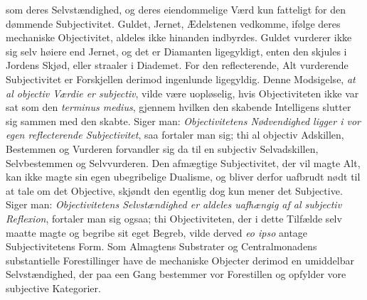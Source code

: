 \documentclass[12pt]{book}
\begin{document}
%
%
%
%
som deres Selvstændighed, og deres eiendommelige Værd kun fatteligt for den dømmende
Subjectivitet. Guldet, Jernet, Ædelstenen vedkomme, ifølge deres mechaniske
Objectivitet, aldeles ikke hinanden indbyrdes. Guldet vurderer ikke sig selv høiere end
Jernet, og det er Diamanten ligegyldigt, enten den skjules i Jordens Skjød, eller
straaler i Diademet. For den reflecterende, Alt vurderende Subjectivitet er Forskjellen
derimod ingenlunde ligegyldig. Denne Modsigelse, \emph{at al objectiv Værdie er
subjectiv}, vilde være uopløselig, hvis Objectiviteten ikke var sat som den
\textit{terminus medius}, gjennem hvilken den skabende Intelligens slutter sig sammen
med den skabte. Siger man: \emph{Objectivitetens Nødvendighed ligger i vor egen
reflecterende Subjectivitet}, saa fortaler man sig; thi al objectiv Adskillen,
Bestemmen og Vurderen forvandler sig da til en subjectiv Selvadskillen, Selvbestemmen og
Selvvurderen. Den afmægtige Subjectivitet, der vil magte Alt, kan ikke magte sin egen
ubegribelige Dualisme, og bliver derfor uafbrudt nødt til at tale om det Objective,
skjøndt den egentlig dog kun mener det Subjective. Siger man: \emph{Objectivitetens
Selvstændighed er aldeles uafhængig af al subjectiv Reflexion}, fortaler man sig ogsaa;
thi Objectiviteten, der i dette Tilfælde selv maatte magte og begribe sit eget Begreb,
vilde derved \textit{eo ipso} antage Subjectivitetens Form. Som Almagtens Substrater og
Centralmonadens substantielle Forestillinger have de mechaniske Objecter derimod en
umiddelbar Selvstændighed, der paa een Gang bestemmer vor Forestillen og opfylder vore
subjective Kategorier.
\end{document}
